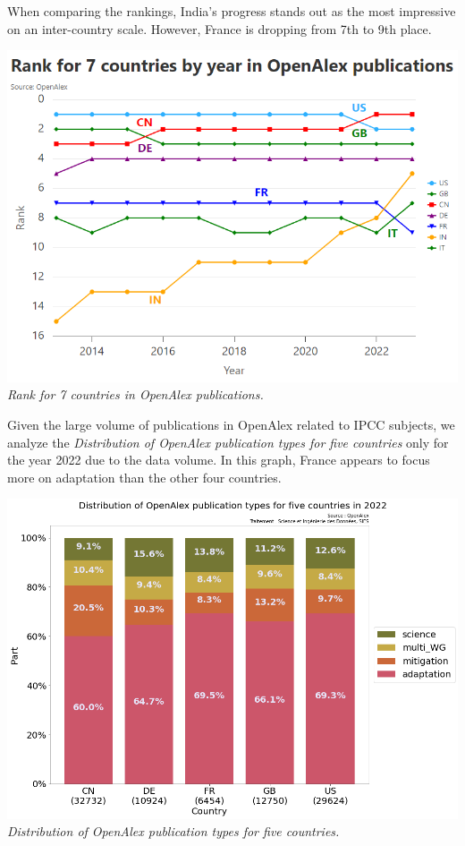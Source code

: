 \documentclass[
]{article}
\begin{document}
When comparing the rankings, India's progress stands out as the most
impressive on an inter-country scale. However, France is dropping from
7th to 9th place.

\includegraphics{./images/teds_OA_rank7.png} \emph{Rank for 7 countries
in OpenAlex publications.}

Given the large volume of publications in OpenAlex related to IPCC
subjects, we analyze the \emph{Distribution of OpenAlex publication
types for five countries} only for the year 2022 due to the data volume.
In this graph, France appears to focus more on adaptation than the other
four countries.

\includegraphics{./images/teds_OpenAlex_publications_for_5_countries.png}
\emph{Distribution of OpenAlex publication types for five countries.}
\end{document}
